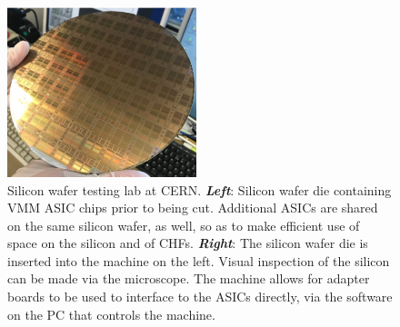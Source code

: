 \begin{figure}[!htb]
    \begin{center}
        \includegraphics[width=0.49\textwidth]{figures/nsw/use_cases/verso_use_case_vmm_die}
        \caption{
            Silicon wafer testing lab at CERN.
            \textbf{\textit{Left}}: Silicon wafer die containing VMM ASIC chips prior to being cut.
                Additional ASICs are shared on the same silicon wafer, as well, so as to make efficient
                use of space on the silicon and of CHFs.
            \textbf{\textit{Right}}: The silicon wafer die is inserted into the machine on the left.
                Visual inspection of the silicon can be made via the microscope.
                The machine allows for adapter boards to be used to interface to the ASICs directly,
                via the software on the PC that controls the machine.
        }
        \label{fig:vrs_vmm_prod}
    \end{center}
\end{figure}
